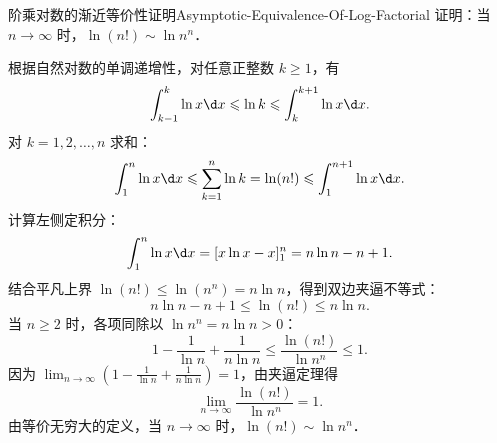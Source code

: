\begin{problem}{阶乘对数的渐近等价性证明}{Asymptotic-Equivalence-Of-Log-Factorial}
    证明：当 $n \to \infty$ 时，$\ln(n!) \sim \ln n^n$．
\end{problem}

\begin{myproof}
    根据自然对数的单调递增性，对任意正整数 $k \geqslant 1$，有
    \begin{equation}
        \int_{k-1}^k \ln x\d x \leqslant \ln k \leqslant \int_k^{k+1} \ln x\d x.
    \end{equation}
    对 $k = 1, 2, \dots, n$ 求和：
    \begin{equation}
        \int_1^n \ln x\d x \leqslant \sum_{k=1}^n \ln k = \ln(n!) \leqslant \int_1^{n+1} \ln x\d x.
    \end{equation}
    计算左侧定积分：
    \begin{equation}
        \int_1^n \ln x\d x = [x\ln x - x]_1^n = n\ln n - n + 1.
    \end{equation}
    结合平凡上界 $\ln(n!) \leqslant \ln(n^n) = n\ln n$，得到双边夹逼不等式：
    \begin{equation}
        n\ln n - n + 1 \leqslant \ln(n!) \leqslant n\ln n.
    \end{equation}
    当 $n \geqslant 2$ 时，各项同除以 $\ln n^n = n\ln n > 0$：
    \begin{equation}
        1 - \frac{1}{\ln n} + \frac{1}{n\ln n} \leqslant \frac{\ln(n!)}{\ln n^n} \leqslant 1.
    \end{equation}
    因为 $\lim_{n\to\infty} \left( 1 - \frac{1}{\ln n} + \frac{1}{n\ln n} \right) = 1$，由夹逼定理得
    \begin{equation}
        \lim_{n\to\infty} \frac{\ln(n!)}{\ln n^n} = 1.
    \end{equation}
    由等价无穷大的定义，当 $n \to \infty$ 时，$\ln(n!) \sim \ln n^n$．
\end{myproof}

\endinput
